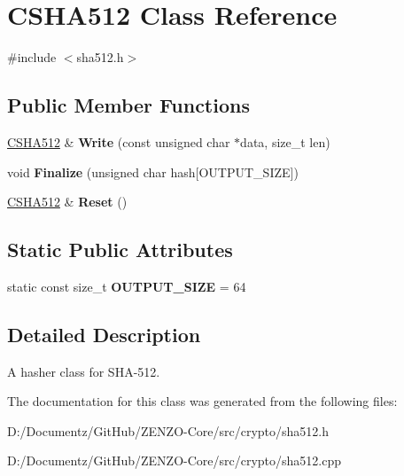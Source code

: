 \hypertarget{class_c_s_h_a512}{}\section{C\+S\+H\+A512 Class Reference}
\label{class_c_s_h_a512}


{\ttfamily \#include $<$sha512.\+h$>$}

\subsection*{Public Member Functions}
\begin{DoxyCompactItemize}
\item 
\mbox{\label{class_c_s_h_a512_aefd8260a2c205f11d44670ae68f1aff0}} 
\mbox{\hyperlink{class_c_s_h_a512}{C\+S\+H\+A512}} \& {\bfseries Write} (const unsigned char $\ast$data, size\+\_\+t len)
\item 
\mbox{\label{class_c_s_h_a512_aef4627aae19eeeb54bf02ea7b222b688}} 
void {\bfseries Finalize} (unsigned char hash\mbox{[}O\+U\+T\+P\+U\+T\+\_\+\+S\+I\+ZE\mbox{]})
\item 
\mbox{\label{class_c_s_h_a512_a6c469e0a6d1988cb255acf15afc66c2e}} 
\mbox{\hyperlink{class_c_s_h_a512}{C\+S\+H\+A512}} \& {\bfseries Reset} ()
\end{DoxyCompactItemize}
\subsection*{Static Public Attributes}
\begin{DoxyCompactItemize}
\item 
\mbox{\label{class_c_s_h_a512_a2de748ad386b21314f9990029d41dd53}} 
static const size\+\_\+t {\bfseries O\+U\+T\+P\+U\+T\+\_\+\+S\+I\+ZE} = 64
\end{DoxyCompactItemize}


\subsection{Detailed Description}
A hasher class for S\+H\+A-\/512. 

The documentation for this class was generated from the following files\+:\begin{DoxyCompactItemize}
\item 
D\+:/\+Documentz/\+Git\+Hub/\+Z\+E\+N\+Z\+O-\/\+Core/src/crypto/sha512.\+h\item 
D\+:/\+Documentz/\+Git\+Hub/\+Z\+E\+N\+Z\+O-\/\+Core/src/crypto/sha512.\+cpp\end{DoxyCompactItemize}
